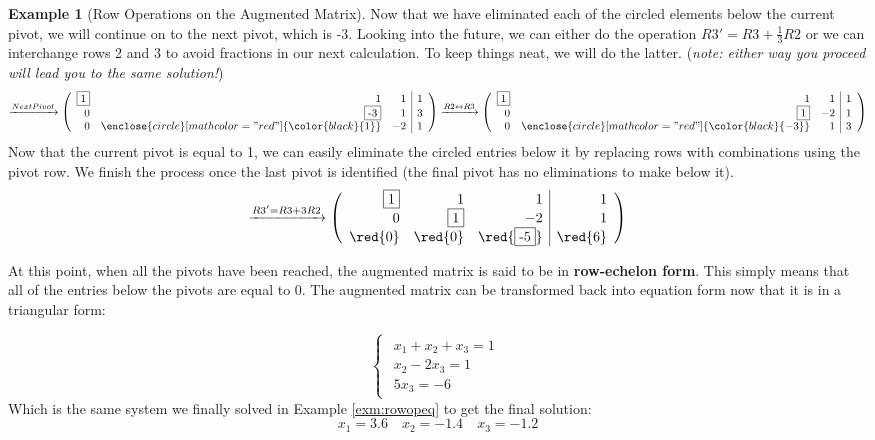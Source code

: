\documentclass[
]{article}
\theoremstyle{definition}
\theoremstyle{definition}
\newtheorem{example}{Example}[section]
\theoremstyle{definition}
\theoremstyle{definition}
\theoremstyle{remark}
\begin{document}
\begin{example}[Row Operations on the Augmented Matrix]
Now that we have eliminated each of the circled elements below the current pivot, we will continue on to the next pivot, which is -3. Looking into the future, we can either do the operation \(R3'=R3+\frac{1}{3}R2\) or we can interchange rows 2 and 3 to avoid fractions in our next calculation. To keep things neat, we will do the latter. (\emph{note: either way you proceed will lead you to the same solution!})
\begin{equation*} \xrightarrow{Next Pivot}
    \left(\begin{array}{rrr|r}
\fbox{1} & 1 & 1 & 1\\
0 & \fbox{-3} & 1 &3\\
0&\enclose{circle}[mathcolor="red"]{\color{black}{1}}&-2&1
\end{array}\right)
 \xrightarrow{R2 \leftrightarrow R3}      \left(\begin{array}{rrr|r}
 \fbox{1} & 1 & 1 & 1\\
 0&\fbox{1}&-2&1\\
0 & \enclose{circle}[mathcolor="red"]{\color{black}{-3}} & 1 &3
\end{array}\right)
\end{equation*}
Now that the current pivot is equal to 1, we can easily eliminate the circled entries below it by replacing rows with combinations using the pivot row. We finish the process once the last pivot is identified (the final pivot has no eliminations to make below it).
\begin{equation*}
 \xrightarrow{R3'=R3+3R2}
     \left(\begin{array}{rrr|r}
 \fbox{1} & 1 & 1 & 1\\
 0&\fbox{1}&-2&1\\
\red{0} & \red{0} & \red{\fbox{-5}} &\red{6}
\end{array}\right)
\end{equation*}

At this point, when all the pivots have been reached, the augmented matrix is said to be in \textbf{row-echelon form}. This simply means that all of the entries below the pivots are equal to 0. The augmented matrix can be transformed back into equation form now that it is in a triangular form:

\begin{equation*}
\begin{cases}\begin{align}
x_1+x_2 +x_3= 1\\
x_2-2x_3 = 1\\
5x_3 =-6\end{align}\end{cases}
\end{equation*}
Which is the same system we finally solved in Example \ref{exm:rowopeq} to get the final solution:
\[x_1 = 3.6 \quad x_2 = -1.4 \quad x_3 = -1.2 \]

\end{example}
\end{document}
